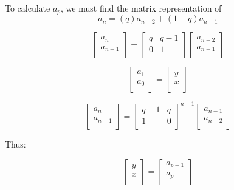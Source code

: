 \documentclass[paper.tex]{subfiles}
\begin{document}
To calculate $a_{p}$, we must find the matrix representation of 
$$ a_{n} = (q)a_{n-2} + (1-q)a_{n-1} $$



\[ 
\left[ \begin{array}{ccc}
a_{n} \\
a_{n-1} \\
\end{array} \right] 
=
\left[ \begin{array}{ccc}
q & q-1 \\
0 & 1 \\
\end{array} \right]
\left[ \begin{array}{ccc}
 a_{n-2}\\
a_{n-1} \\
\end{array} \right]
\] 

\[ 
\left[ \begin{array}{ccc}
a_{1} \\
a_{0} \\
\end{array} \right] 
=
\left[ \begin{array}{ccc}
y \\
x \\
\end{array} \right]
\] 

\[ 
\left[ \begin{array}{ccc}
a_{n} \\
a_{n-1} \\
\end{array} \right] 
=
\left[ \begin{array}{ccc}
q-1 & q \\
1 & 0 \\
\end{array} \right] ^{n-1}
\left[ \begin{array}{ccc}
 a_{n-1}\\
a_{n-2} \\
\end{array} \right]
\] 

Thus:

\[ 
\left[ \begin{array}{ccc}
y \\
x \\
\end{array} \right] 
=
\left[ \begin{array}{ccc}
a_{p+1} \\
a_{p} \\
\end{array} \right]
\] 
\end{document}
